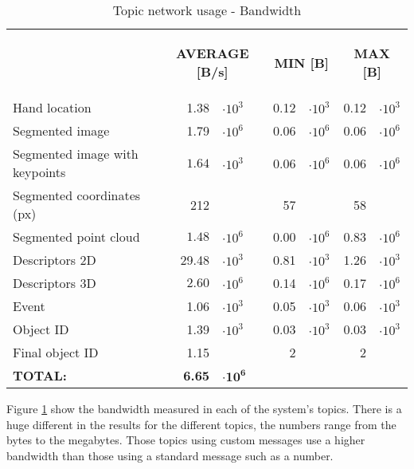 \begin{table}[H]
\centering
\begin{tabular} {l  r@{}l r@{}l r@{}l  }
\toprule
\addlinespace[3mm]
   \multicolumn{1}{c}{\begin{center}\textbf{TOPIC}\end{center}} &
   \multicolumn{2}{c}{\begin{flushright}\textbf{AVERAGE [B/s]}\end{flushright}} &
   \multicolumn{2}{c}{\begin{flushright}\textbf{MIN [B]}\end{flushright}} &
   \multicolumn{2}{c}{\begin{flushright}\textbf{MAX [B]}\end{flushright}} &\\

\addlinespace[-3mm]
\midrule

Hand location & \hspace*{0.6cm}1.38 & $\cdot10^{3}$ & 0.12 & $\cdot10^{3}$	& 0.12 & $\cdot10^{3}$ \\
Segmented image & 1.79& $\cdot10^{6}$		&	0.06 & $\cdot10^{6}$	&	0.06 & $\cdot10^{6}$
\\
Segmented image with keypoints & $1.64$ & $\cdot10^{3}$		&	0.06 & $\cdot10^{6}$	&	0.06 & $\cdot10^{6}$
\\
Segmented coordinates (px) & 212&& 57 && 58 &\\
Segmented point cloud & $1.48$& $\cdot10^{6}$ & 	0.00 & $\cdot10^{6}$	&	0.83 & $\cdot10^{6}$
\\
Descriptors 2D & 29.48&$\cdot10^{3}$	&	0.81 & $\cdot10^{3}$	&	1.26 & $\cdot10^{3}$
\\
Descriptors 3D & $2.60$&$\cdot10^{6}$	&	0.14 & $\cdot10^{6}$	&	0.17 & $\cdot10^{6}$
\\
Event & 1.06&$\cdot10^{3}$ & 	0.05 & $\cdot10^{3}$	&	0.06 & $\cdot10^{3}$
\\
Object ID & 1.39&$\cdot10^{3}$	&		0.03 & $\cdot10^{3}$	&	0.03 & $\cdot10^{3}$
\\
Final object ID & 1.15&&		2 & &	2 & 
\\
\textbf{TOTAL: } & \textbf{6.65}& $\mathbf{\cdot 10^{6}}$ &&&& \\
\bottomrule
\end{tabular}
\caption[Topic network usage - Bandwidth]{Topic network usage - Bandwidth}
\label{bw}

\end{table}


			Figure \ref{bw} show the bandwidth measured in each of the system's topics. 
			There is a huge different in the results for the different topics, the numbers range from the bytes to the megabytes. 
			Those topics using custom messages use a higher bandwidth than those using a standard message such as a number. 
			\\

